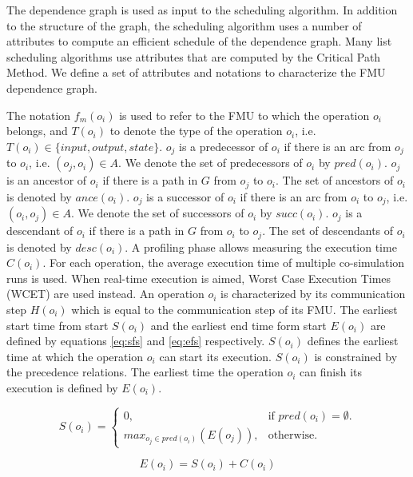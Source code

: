 The dependence graph is used as input to the scheduling algorithm. In addition to the structure of the graph, the scheduling algorithm uses a number of attributes to compute an efficient schedule of the dependence graph. Many list scheduling algorithms use attributes that are computed by the Critical Path Method. We define a set of attributes and notations to characterize the FMU dependence graph.

The notation $f_m(o_i)$ is used to refer to the FMU to which the operation $o_i$ belongs, and $T(o_i)$ to denote the type of the operation $o_i$, i.e. $T(o_i) \in \{input,output,state\}$. $o_j$ is a predecessor of $o_i$ if there is an arc from $o_j$ to $o_i$, i.e. $(o_j, o_i) \in A$. We denote the set of predecessors of $o_i$ by $pred(o_i)$. $o_j$ is an ancestor of $o_i$ if there is a path in $G$ from $o_j$ to $o_i$. The set of ancestors of $o_i$ is denoted by $ance(o_i)$. $o_j$ is a successor of $o_i$ if there is an arc from $o_i$ to $o_j$, i.e. $(o_i, o_j) \in A$. We denote the set of successors of $o_i$ by $succ(o_i)$. $o_j$ is a descendant of $o_i$ if there is a path in $G$ from $o_i$ to $o_j$. The set of descendants of $o_i$ is denoted by $desc(o_i)$. A profiling phase allows measuring the execution time $C(o_i)$. For each operation, the average execution time of multiple co-simulation runs is used. When real-time execution is aimed, Worst Case Execution Times (WCET) are used instead. An operation $o_i$ is characterized by its communication step $H(o_i)$ which is equal to the communication step of its FMU. The earliest start time from start $S(o_i)$ and the earliest end time form start $E(o_i)$ are defined by equations \ref{eq:sfs} and \ref{eq:efs} respectively. $S(o_i)$ defines the earliest time at which the operation $o_i$ can start its execution. $S(o_i)$ is constrained by the precedence relations. The earliest time the operation $o_i$ can finish its execution is defined by $E(o_i)$.

\begin{equation}
S(o_i)=\begin{cases}
    0, & \text{if $pred(o_i)=\emptyset$}.\\
    max_{o_j \in pred(o_i)}(E(o_j)), & \text{otherwise}.
  \end{cases}
	\label{eq:sfs}
\end{equation}

\begin{equation}
	E(o_i)=S(o_i)+C(o_i) 
	\label{eq:efs}
\end{equation}

